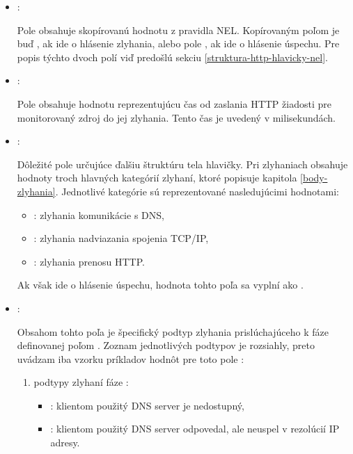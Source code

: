 \begin{itemize}
    \item {}:

    Pole obsahuje skopírovanú hodnotu z pravidla NEL. Kopírovaným poľom je buď , ak ide o hlásenie zlyhania, alebo pole , ak ide o hlásenie úspechu.
    Pre popis týchto dvoch polí viď predošlú sekciu \ref{struktura-http-hlavicky-nel}.
    
    \item {}:

    Pole obsahuje hodnotu reprezentujúcu čas od zaslania HTTP žiadosti pre monitorovaný zdroj do jej zlyhania.
    Tento čas je uvedený v milisekundách.
    
    \item {}:

    Dôležité pole určujúce ďalšiu štruktúru tela hlavičky.
    Pri zlyhaniach obsahuje hodnoty troch hlavných kategórií zlyhaní, ktoré popisuje kapitola \ref{body-zlyhania}.
    Jednotlivé kategórie sú reprezentované nasledujúcimi hodnotami: 
    \begin{itemize}
        \item {}: zlyhania komunikácie s DNS,
        \item {}: zlyhania nadviazania spojenia TCP/IP,
        \item {}: zlyhania prenosu HTTP.
    \end{itemize}

    Ak však ide o hlásenie úspechu, hodnota tohto poľa sa vyplní ako .

    \item {}:

    Obsahom tohto poľa je špecifický podtyp zlyhania prislúchajúceho k fáze definovanej poľom .
    Zoznam jednotlivých podtypov je rozsiahly, preto uvádzam iba vzorku príkladov hodnôt pre toto pole \cite{W3C-NEL}:
    \begin{enumerate}
        \item podtypy zlyhaní fáze :
        \begin{itemize}
            \item {}: klientom použitý DNS server je nedostupný,
            \item {}: klientom použitý DNS server odpovedal, ale neuspel v rezolúcií IP adresy.
        \end{itemize}
        

\end{enumerate}
\end{itemize}
